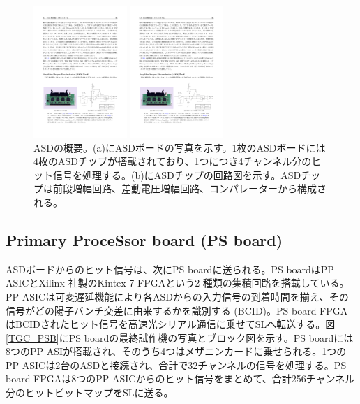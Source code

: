     \begin{figure}
    \begin{minipage}[b]{.5\linewidth}
    \centering
    \includegraphics[height=5cm]{fig/Intro/TGC_ASD.pdf}
    \end{minipage}%
    \begin{minipage}[b]{.5\linewidth}
    \centering
    \includegraphics[height=5cm]{fig/Intro/TGC_ASDcircuite.pdf}
    \end{minipage}%
    \caption[ASDの概要]{ASDの概要\cite{ASD}。(a)にASDボードの写真を示す。1枚のASDボードには4枚のASDチップが搭載されており、1つにつき4チャンネル分のヒット信号を処理する。(b)にASDチップの回路図を示す。ASDチップは前段増幅回路、差動電圧増幅回路、コンパレーターから構成される。}
    \label{TGC_ASD}
    \end{figure}

        \subsection*{Primary ProceSsor board (PS board)}
    ASDボードからのヒット信号は、次にPS boardに送られる。PS boardはPP ASICとXilinx 社製のKintex-7 FPGAという2 種類の集積回路を搭載している。PP ASICは可変遅延機能により各ASDからの入力信号の到着時間を揃え、その信号がどの陽子バンチ交差に由来するかを識別する (BCID)。PS board FPGAはBCIDされたヒット信号を高速光シリアル通信に乗せてSLへ転送する。図\ref{TGC_PSB}にPS boardの最終試作機の写真とブロック図を示す。PS boardには8つのPP ASIが搭載され、そのうち4つはメザニンカードに乗せられる。1つのPP ASICは2台のASDと接続され、合計で32チャンネルの信号を処理する。PS board FPGAは8つのPP ASICからのヒット信号をまとめて、合計256チャンネル分のヒットビットマップをSLに送る。

